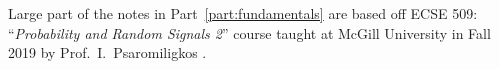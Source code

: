 Large part of the notes in Part~\ref{part:fundamentals} are based off ECSE 509: ``\emph{Probability and Random Signals 2}'' course taught at McGill University in Fall 2019 by Prof.~I.~Psaromiligkos \cite{psaromiligkosSlidesECSE5092019}.
